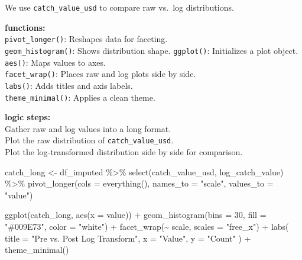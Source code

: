 \documentclass[
]{article}
\newenvironment{Shaded}{\begin{snugshade}}{\end{snugshade}}
\newcommand{\AttributeTok}[1]{\textcolor[rgb]{0.77,0.63,0.00}{#1}}
\newcommand{\DecValTok}[1]{\textcolor[rgb]{0.00,0.00,0.81}{#1}}
\newcommand{\FunctionTok}[1]{\textcolor[rgb]{0.00,0.00,0.00}{#1}}
\newcommand{\NormalTok}[1]{#1}
\newcommand{\OtherTok}[1]{\textcolor[rgb]{0.56,0.35,0.01}{#1}}
\newcommand{\SpecialCharTok}[1]{\textcolor[rgb]{0.00,0.00,0.00}{#1}}
\newcommand{\StringTok}[1]{\textcolor[rgb]{0.31,0.60,0.02}{#1}}
\begin{document}
We use \texttt{catch\_value\_usd} to compare raw vs.~log distributions.

\textbf{functions:}\\
\texttt{pivot\_longer()}: Reshapes data for faceting.\\
\texttt{geom\_histogram()}: Shows distribution shape. \texttt{ggplot()}:
Initializes a plot object.\\
\texttt{aes()}: Maps values to axes.\\
\texttt{facet\_wrap()}: Places raw and log plots side by side.\\
\texttt{labs()}: Adds titles and axis labels.\\
\texttt{theme\_minimal()}: Applies a clean theme.

\textbf{logic steps:}\\
Gather raw and log values into a long format.\\
Plot the raw distribution of \texttt{catch\_value\_usd}.\\
Plot the log-transformed distribution side by side for comparison.

\begin{Shaded}
\begin{Highlighting}[]
\NormalTok{catch\_long }\OtherTok{\textless{}{-}}\NormalTok{ df\_imputed }\SpecialCharTok{\%\textgreater{}\%}
  \FunctionTok{select}\NormalTok{(catch\_value\_usd, log\_catch\_value) }\SpecialCharTok{\%\textgreater{}\%}
  \FunctionTok{pivot\_longer}\NormalTok{(}\AttributeTok{cols =} \FunctionTok{everything}\NormalTok{(), }\AttributeTok{names\_to =} \StringTok{"scale"}\NormalTok{, }\AttributeTok{values\_to =} \StringTok{"value"}\NormalTok{)}

\FunctionTok{ggplot}\NormalTok{(catch\_long, }\FunctionTok{aes}\NormalTok{(}\AttributeTok{x =}\NormalTok{ value)) }\SpecialCharTok{+}
  \FunctionTok{geom\_histogram}\NormalTok{(}\AttributeTok{bins =} \DecValTok{30}\NormalTok{, }\AttributeTok{fill =} \StringTok{"\#009E73"}\NormalTok{, }\AttributeTok{color =} \StringTok{"white"}\NormalTok{) }\SpecialCharTok{+}
  \FunctionTok{facet\_wrap}\NormalTok{(}\SpecialCharTok{\textasciitilde{}}\NormalTok{ scale, }\AttributeTok{scales =} \StringTok{"free\_x"}\NormalTok{) }\SpecialCharTok{+}
  \FunctionTok{labs}\NormalTok{(}
    \AttributeTok{title =} \StringTok{"Pre vs. Post Log Transform"}\NormalTok{,}
    \AttributeTok{x =} \StringTok{"Value"}\NormalTok{,}
    \AttributeTok{y =} \StringTok{"Count"}
\NormalTok{  ) }\SpecialCharTok{+}
  \FunctionTok{theme\_minimal}\NormalTok{()}
\end{Highlighting}
\end{Shaded}
\end{document}

